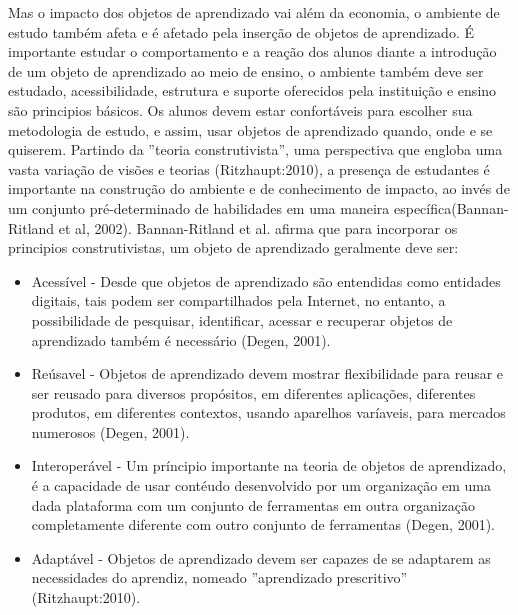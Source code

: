 \documentclass[12pt,openright,oneside,a4paper,english,french,spanish,brazil]{unifil}
\begin{document}
Mas o impacto dos objetos de aprendizado vai além da economia, o ambiente de estudo também afeta e é afetado pela inserção de objetos de aprendizado. É importante estudar o comportamento e a reação dos alunos diante a introdução de um objeto de aprendizado ao meio de ensino, o ambiente também deve ser estudado, acessibilidade, estrutura e suporte oferecidos pela instituição e ensino são principios básicos. Os  alunos devem estar confortáveis para escolher sua metodologia de estudo, e assim, usar objetos de aprendizado quando, onde e se quiserem. Partindo da ''teoria construtivista'', uma perspectiva que engloba uma vasta variação de visões e teorias (Ritzhaupt:2010), a presença de estudantes é importante na construção do ambiente e de conhecimento de impacto, ao invés de um conjunto pré-determinado de habilidades em uma maneira específica(Bannan-Ritland et al, 2002). Bannan-Ritland et al. afirma que para incorporar os principios construtivistas, um objeto de aprendizado geralmente deve ser:
\begin{itemize}
\item Acessível - Desde que objetos de aprendizado são entendidas como entidades digitais, tais podem ser compartilhados pela Internet, no entanto, a possibilidade de pesquisar, identificar, acessar e recuperar objetos de aprendizado também é necessário (Degen, 2001).
\item Reúsavel - Objetos de aprendizado devem mostrar flexibilidade para reusar e ser reusado para diversos propósitos, em diferentes aplicações, diferentes produtos, em diferentes contextos, usando aparelhos varíaveis, para mercados numerosos (Degen, 2001).
\item Interoperável - Um príncipio importante na teoria de objetos de aprendizado, é a capacidade de usar contéudo desenvolvido por um organização em uma dada plataforma com um conjunto de ferramentas em outra organização completamente diferente com outro conjunto de ferramentas (Degen, 2001).
\item Adaptável - Objetos de aprendizado devem ser capazes de se adaptarem as necessidades do aprendiz, nomeado ''aprendizado prescritivo'' (Ritzhaupt:2010).
\end{itemize}
\end{document}
